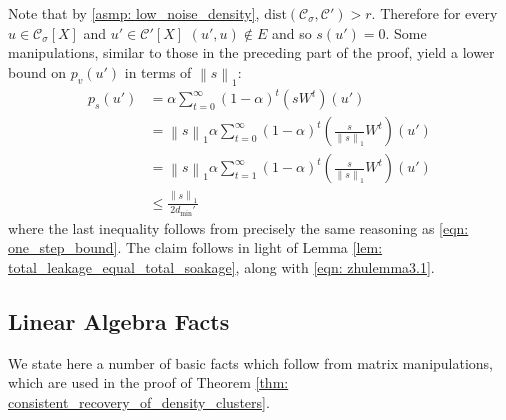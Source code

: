 \documentclass[11pt,twoside]{article}
\theoremstyle{definition}
\newcommand{\norm}[1]{\left\lVert#1\right\rVert}
\newcommand{\1}{\mathbbm{1}}
\newcommand{\dist}{\mathrm{dist}}
\newcommand{\pbf}{p}        %
\newcommand{\Xbf}{X}
\newcommand{\Wbf}{W}
\newcommand{\Cset}{\mathcal{C}}
\newcommand{\Csig}{\Cset_{\sigma}}
\newcommand{\degminpr}{d_{\min}'}
\begin{document}
	Note that by \ref{asmp: low_noise_density}, $\dist(\Csig,\Cset') > r$. Therefore for every $u \in \Csig[\Xbf]$ and $u' \in \Cset'[\Xbf]$ $(u',u) \not\in E$ and so $s(u') = 0$. Some manipulations, similar to those in the preceding part of the proof, yield a lower bound on $\pbf_v(u')$ in terms of $\norm{s}_1$:
	\begin{align*}
	\pbf_s(u') & = \alpha \sum_{t = 0}^{\infty} (1 - \alpha)^t \left(s \Wbf^t\right)(u') \\
	& = \norm{s}_1 \alpha \sum_{t = 0}^{\infty} (1 - \alpha)^t \left(\frac{s}{\norm{s}_1} \Wbf^t\right)(u') \\
	& = \norm{s}_1 \alpha \sum_{t = 1}^{\infty} (1 - \alpha)^t \left(\frac{s}{\norm{s}_1} \Wbf^t\right)(u') \\
	& \leq \frac{\norm{s}_1}{2\degminpr}
	\end{align*}
	where the last inequality follows from precisely the same reasoning as \eqref{eqn: one_step_bound}. The claim follows in light of Lemma \ref{lem: total_leakage_equal_total_soakage}, along with \eqref{eqn: zhulemma3.1}.

\subsection{Linear Algebra Facts}
\label{sec: linalg}

We state here a number of basic facts which follow from matrix manipulations, which are used in the proof of Theorem \ref{thm: consistent_recovery_of_density_clusters}. 
\end{document}
